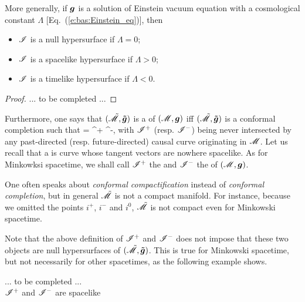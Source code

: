 More generally, if $\bm{g}$ is a solution of Einstein vacuum equation with
a cosmological constant $\Lambda$ [Eq.~(\ref{e:bas:Einstein_eq})], then
\begin{itemize}
\item $\mathscr{I}$ is a null hypersurface if $\Lambda=0$;
\item $\mathscr{I}$ is a spacelike hypersurface if $\Lambda>0$;
\item $\mathscr{I}$ is a timelike hypersurface if $\Lambda<0$.
\end{itemize}
\begin{proof}
... to be completed ...
\end{proof}



Furthermore, one says that $(\tilde{\mathscr{M}},\bm{\tilde{g}})$ is a
of $(\mathscr{M},\bm{g})$
iff $(\tilde{\mathscr{M}},\bm{\tilde{g}})$  is a conformal completion such that
\be
    \scri = \scri^+ \cup \scri^-,
\ee
with $\mathscr{I}^+$ (resp. $\mathscr{I}^-$) being never intersected by any past-directed
(resp. future-directed) causal
curve originating in $\mathscr{M}$. Let us recall that a
 is
curve whose tangent vectors are nowhere spacelike.
As for Minkowksi spacetime, we shall call $\mathscr{I}^+$ the
and $\mathscr{I}^-$ the 
of $(\mathscr{M},\bm{g})$.

\begin{remark}
One often speaks about \emph{conformal compactification}
instead of \emph{conformal completion}, but in general $\tilde{\mathscr{M}}$ is not a
compact manifold. For instance, because we omitted the points $i^+$, $i^-$ and $i^0$,
$\tilde{\mathscr{M}}$ is not compact even for Minkowski spacetime.
\end{remark}

\begin{remark}
Note that the above definition of $\mathscr{I}^+$ and $\mathscr{I}^-$ does not impose
that these two objects are null hypersurfaces of $(\tilde{\mathscr{M}},\bm{\tilde{g}})$.
This is true for Minkowski spacetime, but not necessarily for other spacetimes,
as the following example shows.
\end{remark}

\begin{example}
... to be completed ... \\
$\mathscr{I}^+$ and $\mathscr{I}^-$ are spacelike
\end{example}


